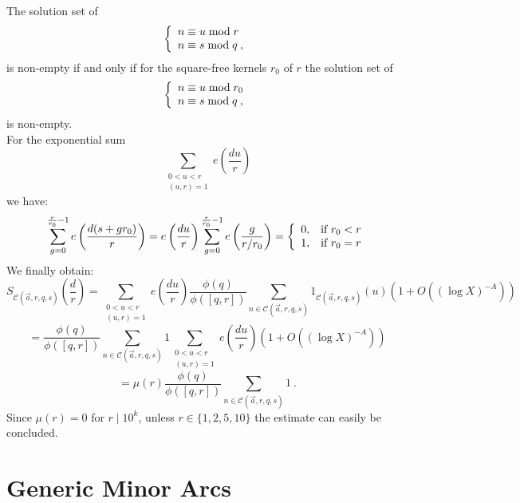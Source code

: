 \documentclass{amsart}
\numberwithin{equation}{subsection}
\begin{document}
The solution set of 
\begin{eqnarray}
\left\{ 
  \begin{array}{l l}
   n\equiv u \bmod r \\ 
   n\equiv s \bmod q\:,\\
  \end{array} \right.
\nonumber
\end{eqnarray}
is non-empty if and only if for the square-free kernels $r_0$ of $r$ the solution set of 
\begin{eqnarray}
\left\{ 
  \begin{array}{l l}
   n\equiv u \bmod r_0 \\ 
   n\equiv s \bmod q\:,\\
  \end{array} \right.
\nonumber
\end{eqnarray}
is non-empty.\\
For the exponential sum
$$\sum_{\substack{0< u< r \\ (u, r)=1}}e\left(\frac{du}{r}\right)$$ we have:
$$\sum_{g=0}^{\frac{r}{r_0}-1}e\left( \frac{d(s+gr_0)}{r}  \right)=e\left(\frac{du}{r}\right)\sum_{g=0}^{\frac{r}{r_0}-1}e\left(\frac{g}{r/r_0}\right)
=
\left\{ 
  \begin{array}{l l}
   0, &\text{if}\ r_0<r \\ 
   1, &\text{if}\ r_0=r \\ 
  \end{array} \right.
\nonumber$$
We finally obtain:
$$S_{\mathcal{C}(\vec{a}, r, q, s)}\left(\frac{d}{r}\right)=\sum_{\substack{0< u< r \\ (u, r)=1}}e\left(\frac{du}{r}\right)\frac{\phi(q)}{\phi([q, r])}
\sum_{n\in \mathcal{C}(\vec{a}, r, q, s)} 1_{\mathcal{C}(\vec{a}, r, q, s)}(u)\left(1+O((\log X)^{-A})  \right)$$
$$= \frac{\phi(q)}{\phi([q, r])} \sum_{n\in  \mathcal{C}(\vec{a}, r, q, s)} 1 \sum_{\substack{0< u< r \\ (u, r)=1}}e\left(\frac{du}{r}\right)\left(1+O((\log X)^{-A})  \right)$$
$$=\mu(r)  \frac{\phi(q)}{\phi([q, r])} \sum_{n\in  \mathcal{C}(\vec{a}, r, q, s)} 1\:.$$
Since $\mu(r)=0$ for $r\mid 10^k$, unless $r\in \{1, 2, 5, 10\}$ the estimate can easily be concluded.



\section{Generic Minor Arcs}
\end{document}
